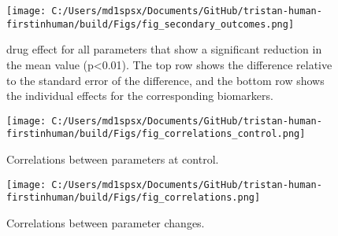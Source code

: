 \documentclass{epflreport}%
\begin{document}
%
\clearpage%


\begin{figure}[h!]%
\centering%
\texttt{[image: C:/Users/md1spsx/Documents/GitHub/tristan-human-firstinhuman/build/Figs/fig\_secondary\_outcomes.png]}%
\caption{drug effect for all parameters that show a significant reduction in the mean value (p<0.01). The top row shows the difference relative to the standard error of the difference, and the bottom row shows the individual effects for the corresponding biomarkers.}%
\end{figure}

%
\clearpage%


\begin{figure}[h!]%
\centering%
\texttt{[image: C:/Users/md1spsx/Documents/GitHub/tristan-human-firstinhuman/build/Figs/fig\_correlations\_control.png]}%
\caption{Correlations between parameters at control.}%
\end{figure}

%
\clearpage%


\begin{figure}[h!]%
\centering%
\texttt{[image: C:/Users/md1spsx/Documents/GitHub/tristan-human-firstinhuman/build/Figs/fig\_correlations.png]}%
\caption{Correlations between parameter changes.}%
\end{figure}

%
\clearpage%
\end{document}
